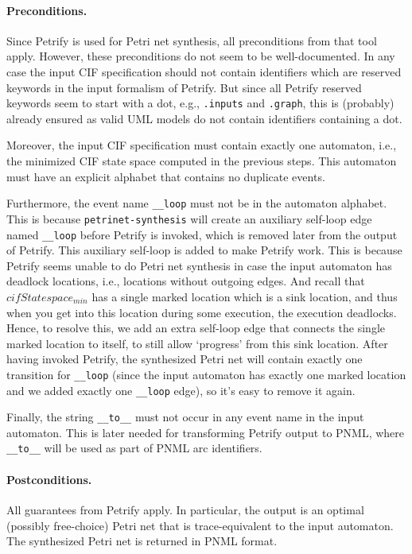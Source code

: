 \documentclass{article}
\newcommand{\keyw}[1]{\texttt{#1}}
\newcommand{\var}[1]{\ensuremath{\mathit{#1}}}
\newcommand{\petrinetSynthesisLabel}[0]{\keyw{petrinet-synthesis}}
\newcommand{\loopLabel}[0]{\texttt{\_\_loop}}
\newcommand{\toLabel}[0]{\texttt{\_\_to\_\_}}
\theoremstyle{definition}
\begin{document}
\paragraph{Preconditions.}
Since Petrify is used for Petri net synthesis, all preconditions from that tool apply.
However, these preconditions do not seem to be well-documented.
In any case the input CIF specification should not contain identifiers which are reserved keywords in the input formalism of Petrify.
But since all Petrify reserved keywords seem to start with a dot, e.g., \texttt{.inputs} and \texttt{.graph}, this is (probably) already ensured as valid UML models do not contain identifiers containing a dot.

Moreover, the input CIF specification must contain exactly one automaton, i.e., the minimized CIF state space computed in the previous steps.
This automaton must have an explicit alphabet that contains no duplicate events.

Furthermore, the event name \loopLabel{} must not be in the automaton alphabet.
This is because \petrinetSynthesisLabel{} will create an auxiliary self-loop edge named \loopLabel{} before Petrify is invoked, which is removed later from the output of Petrify.
This auxiliary self-loop is added to make Petrify work.
This is because Petrify seems unable to do Petri net synthesis in case the input automaton has deadlock locations, i.e., locations without outgoing edges.
And recall that \var{cifStatespace_{min}} has a single marked location which is a sink location, and thus when you get into this location during some execution, the execution deadlocks.
Hence, to resolve this, we add an extra self-loop edge that connects the single marked location to itself, to still allow `progress' from this sink location.
After having invoked Petrify, the synthesized Petri net will contain exactly one transition for \loopLabel{} (since the input automaton has exactly one marked location and we added exactly one \loopLabel{} edge), so it's easy to remove it again.

Finally, the string \toLabel{} must not occur in any event name in the input automaton.
This is later needed for transforming Petrify output to PNML, where \toLabel{} will be used as part of PNML arc identifiers.

\paragraph{Postconditions.}
All guarantees from Petrify apply.
In particular, the output is an optimal (possibly free-choice) Petri net that is trace-equivalent to the input automaton.
The synthesized Petri net is returned in PNML format.
\end{document}
